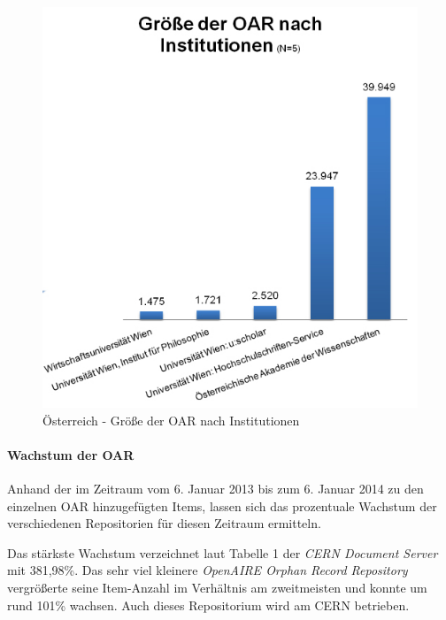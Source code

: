 \documentclass[a4paper,
fontsize=11pt,
oneside,
numbers=noperiodatend,
parskip=half-,
bibliography=totoc,
final
]{scrartcl}
\begin{document}
\begin{figure}[htbp]
\centering
\includegraphics{img/abb7_groesse_oar_at.jpg}
\caption{Österreich - Größe der OAR nach Institutionen}
\end{figure}

\paragraph{Wachstum der OAR}\label{wachstum-der-oar}

Anhand der im Zeitraum vom 6. Januar 2013 bis zum 6. Januar 2014 zu den
einzelnen OAR hinzugefügten Items, lassen sich das prozentuale Wachstum
der verschiedenen Repositorien für diesen Zeitraum ermitteln.

Das stärkste Wachstum verzeichnet laut Tabelle 1 der \emph{CERN Document
Server} mit 381,98\%. Das sehr viel kleinere \emph{OpenAIRE Orphan
Record Repository} vergrößerte seine Item-Anzahl im Verhältnis am
zweitmeisten und konnte um rund 101\% wachsen. Auch dieses Repositorium
wird am CERN betrieben.
\end{document}
